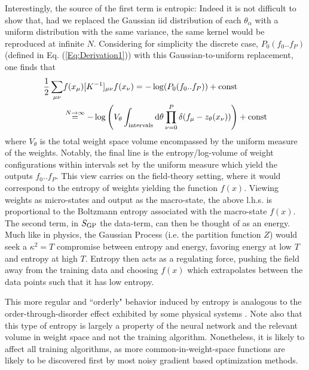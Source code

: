 Interestingly, the source of the first term is entropic: Indeed it is not difficult to show that, had we replaced the Gaussian iid distribution of each $\theta_{\alpha}$ with a uniform distribution with the same variance, the same kernel would be reproduced at infinite $N$. Considering for simplicity the discrete case, $P_0(f_0..f_P)$ (defined in Eq. (\ref{Eq:Derivation1})) with this Gaussian-to-uniform replacement, one finds that 
\begin{align}
\frac{1}{2} \sum_{\mu \nu}&f(x_{\mu}) [K^{-1}]_{\mu \nu} f(x_{\nu}) = -\log(P_0(f_0..f_P)) + \text{const} \\ \nonumber 
&\stackrel{N \rightarrow \infty}{=} -\log\left(V_{\theta}\int_{\text{intervals}} \text{d} \theta \prod_{\nu=0}^P \delta(f_{\mu} - z_{\theta}(x_{\nu}))\right) + \text{const}
\end{align}
where $V_{\theta}$ is the total weight space volume encompassed by the uniform measure of the weights. Notably, 
the final line is the entropy/log-volume of weight configurations within intervals set by the uniform measure which yield the outputs $f_0..f_P$. This view carries on the field-theory setting, where it would correspond to the entropy of weights yielding the function $f(x)$. Viewing weights as micro-states and output as the macro-state, the above l.h.s. is proportional to the Boltzmann entropy associated with the macro-state $f(x)$. The second term, in $S_{\text{GP}}$ the data-term, can then be thought of as an energy. Much like in physics, the Gaussian Process (i.e. the partition function $Z$) would seek a $\kappa^2=T$ compromise between entropy and energy, favoring energy at low $T$ and entropy at high $T$. Entropy then acts as a regulating force, pushing the field away from the training data and choosing $f(x)$ which extrapolates between the data points such that it has low entropy. 

This more regular and ``orderly" behavior induced by entropy is analogous to the order-through-disorder effect exhibited by some physical systems \citep{Villain1980}. Note also that this type of entropy is largely a property of the neural network and the relevant volume in weight space and not the training algorithm. Nonetheless, it is likely to affect all training algorithms, as more common-in-weight-space functions are likely to be discovered first by most noisy gradient based optimization methods. 

